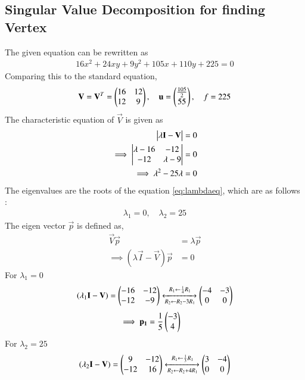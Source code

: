 \documentclass[journal,12pt,twocolumn]{IEEEtran}
\begin{document}
\subsection{Singular Value Decomposition for finding Vertex}
The given equation can be rewritten as
\begin{align}\label{eq:quadraticparabola}
    16x^2+24xy+9y^2+105x+110y+225 = 0
\end{align}
Comparing this to the standard equation,
\begin{align}
    \mathbf{V} = \mathbf{V}^T = \begin{pmatrix}16 & 12\\12 & 9\end{pmatrix}, \quad \mathbf{u} = \begin{pmatrix}\frac{105}{2} \\ 55\end{pmatrix}, \quad f = 225 \label{eq:Vufvals}
\end{align}
The characteristic equation of $\vec{V}$ is given as
\begin{align}
    \begin{vmatrix}\lambda\mathbf{I}-\mathbf{V}\end{vmatrix} = 0\\
    \implies \begin{vmatrix}\lambda-16 & -12 \\ -12 & \lambda-9\end{vmatrix} = 0\\
    \implies \lambda^2 -25\lambda = 0 \label{eq:lambdaeq}
\end{align}
The eigenvalues are the roots of the equation \eqref{eq:lambdaeq}, which are as follows :
\begin{align}
    \lambda_1 = 0, \quad \lambda_2 = 25 \label{eq:eigenval}
\end{align}
The eigen vector $\vec{p}$ is defined as, 
\begin{align}
    \vec{V}\vec{p} &= \lambda\vec{p}\\
    \implies(\lambda\vec{I}-\vec{V})\vec{p}&=0
\end{align}
For $\lambda_1=0$
\begin{align}
    (\lambda_1\mathbf{I}-\mathbf{V}) = \begin{pmatrix}-16 & -12\\-12 & -9\end{pmatrix}\xleftrightarrow[R_2\leftarrow R_2-3R_1]{R_1\leftarrow \frac{1}{4}R_1}\begin{pmatrix}-4 & -3\\0 & 0\end{pmatrix}
\end{align}
\begin{align}
    \implies\mathbf{p_1}&=\frac{1}{5}\begin{pmatrix}-3\\4\end{pmatrix}\label{eq:p1val}
\end{align}
For $\lambda_2=25$
\begin{align}
    (\lambda_2\mathbf{I}-\mathbf{V}) = \begin{pmatrix}9 & -12\\-12 & 16\end{pmatrix}\xleftrightarrow[R_2\leftarrow R_2+4R_1]{R_1\leftarrow \frac{1}{3}R_1}\begin{pmatrix}3 & -4\\0 & 0\end{pmatrix}
\end{align}
\end{document}
